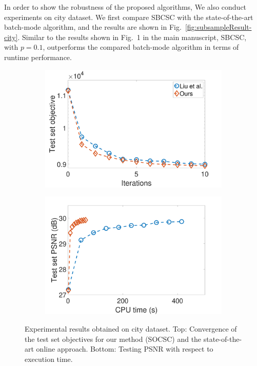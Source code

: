 \documentclass{egpubl}
\begin{document}
In order to show the robustness of the proposed algorithms, We also conduct experiments on city dataset. We first compare SBCSC with the state-of-the-art batch-mode algorithm, and the results are shown in Fig.\ \ref{fig:subsampleResult-city}. Similar to the results shown in Fig.~1 in the main manuscript, SBCSC, with $p=0.1$, outperforms the compared batch-mode algorithm in terms of runtime performance. 

\begin{figure}[h]
\centering
\begin{subfigure}{0.45\textwidth}
  \includegraphics[width=1\linewidth]{figure/onlineVSliu-ite.pdf}
\end{subfigure}
\begin{subfigure}{0.45\textwidth}
  \includegraphics[width=1\linewidth]{figure/onlineVSliu-time.pdf}
\end{subfigure}

\caption{Experimental results obtained on city dataset. Top: Convergence of the test set objectives for our method (SOCSC) and the state-of-the-art online approach. Bottom: Testing PSNR with respect to execution time.}
\label{fig:onlineSmall-city}
\end{figure}
\end{document}
